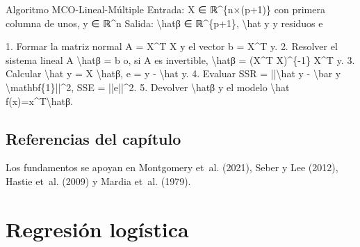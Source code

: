 \documentclass[
  spanish,
  10.5pt,
  letterpaper,
  DIV=11,
  numbers=noendperiod,
  oneside,
  open=any]{scrreprt}
\newenvironment{Shaded}{\begin{snugshade}}{\end{snugshade}}
\newcommand{\NormalTok}[1]{\textcolor[rgb]{0.00,0.23,0.31}{#1}}
\theoremstyle{definition}
\theoremstyle{definition}
\theoremstyle{plain}
\theoremstyle{remark}
\begin{document}
\begin{tcolorbox}[enhanced jigsaw, arc=.35mm, bottomrule=.15mm, bottomtitle=1mm, breakable, colback=white, colbacktitle=quarto-callout-note-color!10!white, colframe=quarto-callout-note-color-frame, coltitle=black, left=2mm, leftrule=.75mm, opacityback=0, opacitybacktitle=0.6, rightrule=.15mm, title=\textcolor{quarto-callout-note-color}{\faInfo}\hspace{0.5em}{Seudocódigo matemático formal}, titlerule=0mm, toprule=.15mm, toptitle=1mm]

\begin{Shaded}
\begin{Highlighting}[numbers=left,,]
\NormalTok{Algoritmo MCO{-}Lineal{-}Múltiple}
\NormalTok{Entrada:}
\NormalTok{  X ∈ ℝ\^{}\{n×(p+1)\} con primera columna de unos, y ∈ ℝ\^{}n}
\NormalTok{Salida:}
\NormalTok{  \textbackslash{}hatβ ∈ ℝ\^{}\{p+1\}, \textbackslash{}hat y y residuos e}

\NormalTok{1. Formar la matriz normal A = X\^{}T X y el vector b = X\^{}T y.}
\NormalTok{2. Resolver el sistema lineal}
\NormalTok{      A \textbackslash{}hatβ = b}
\NormalTok{   o, si A es invertible,}
\NormalTok{      \textbackslash{}hatβ = (X\^{}T X)\^{}\{{-}1\} X\^{}T y.}
\NormalTok{3. Calcular}
\NormalTok{      \textbackslash{}hat y = X \textbackslash{}hatβ,}
\NormalTok{      e = y {-} \textbackslash{}hat y.}
\NormalTok{4. Evaluar}
\NormalTok{      SSR = ||\textbackslash{}hat y {-} \textbackslash{}bar y \textbackslash{}mathbf\{1\}||\^{}2,}
\NormalTok{      SSE = ||e||\^{}2.}
\NormalTok{5. Devolver \textbackslash{}hatβ y el modelo \textbackslash{}hat f(x)=x\^{}T\textbackslash{}hatβ.}
\end{Highlighting}
\end{Shaded}

\end{tcolorbox}

\section*{Referencias del capítulo}\label{referencias-del-capuxedtulo-9}


Los fundamentos se apoyan en Montgomery et~al. (2021), Seber y Lee
(2012), Hastie et~al. (2009) y Mardia et~al. (1979).

\chapter{\texorpdfstring{Regresión
logística}{Regresión logística}}\label{sec-regresion-logistica}
\end{document}
